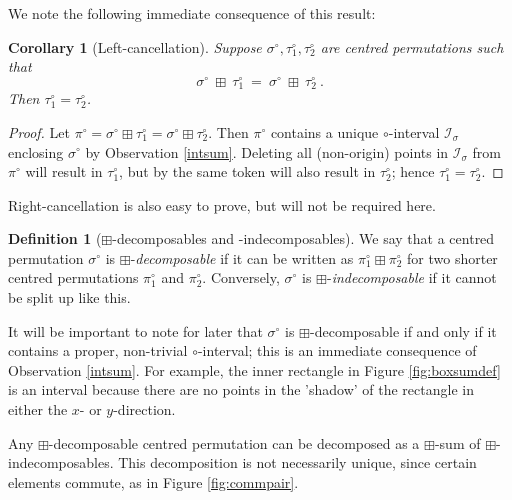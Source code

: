 \documentclass[11pt,a4paper]{article}
\newtheorem{cor}[thm]{Corollary}
\theoremstyle{definition}
\newtheorem{defn}[thm]{Definition}
\begin{document}
We note the following immediate consequence of this result:

\begin{cor}[Left-cancellation]
Suppose $\sigma^{\circ},\tau^{\circ}_{1},\tau^{\circ}_{2}$ are centred permutations such that
\[
\sigma^{\circ} \ \boxplus \ \tau^{\circ}_{1} \ = \ \sigma^{\circ} \ \boxplus \ \tau^{\circ}_{2} \ .
\]
Then $\tau^{\circ}_{1} = \tau^{\circ}_{2}$.
\end{cor}

\begin{proof}
Let $\pi^{\circ} = \sigma^{\circ} \boxplus \tau^{\circ}_{1} = \sigma^{\circ} \boxplus \tau^{\circ}_{2}$. Then $\pi^{\circ}$ contains a unique $\circ$-interval $\mathcal{I}_{\sigma}$ enclosing $\sigma^{\circ}$ by Observation \ref{intsum}. Deleting all (non-origin) points in $\mathcal{I}_{\sigma}$ from $\pi^{\circ}$ will result in $\tau^{\circ}_{1}$, but by the same token will also result in $\tau^{\circ}_{2}$; hence $\tau^{\circ}_{1} = \tau^{\circ}_{2}$.
\end{proof}

Right-cancellation is also easy to prove, but will not be required here.

\begin{defn}[$\boxplus$-decomposables and -indecomposables] \label{def:boxinds}
We say that a centred permutation $\sigma^{\circ}$ is $\boxplus$-\emph{decomposable} if it can be written as $\pi_{1}^{\circ} \boxplus \pi_{2}^{\circ}$ for two shorter centred permutations $\pi_{1}^{\circ}$ and $\pi_{2}^{\circ}$. Conversely, $\sigma^{\circ}$ is $\boxplus$-\emph{indecomposable} if it cannot be split up like this.
\end{defn}

It will be important to note for later that $\sigma^{\circ}$ is $\boxplus$-decomposable if and only if it contains a proper, non-trivial $\circ$-interval; this is an immediate consequence of Observation \ref{intsum}. For example, the inner rectangle in Figure \ref{fig:boxsumdef} is an interval because there are no points in the 'shadow' of the rectangle in either the $x$- or $y$-direction.

Any $\boxplus$-decomposable centred permutation can be decomposed as a $\boxplus$-sum of $\boxplus$-indecomposables. This decomposition is not necessarily unique, since certain elements commute, as in Figure \ref{fig:commpair}.
\end{document}

